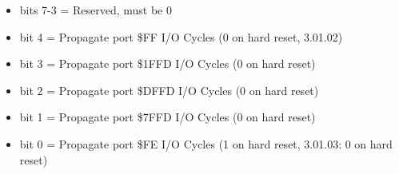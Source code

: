 \begin{itemize}
\item bits 7-3 = Reserved, must be 0
\item bit 4 = Propagate port \$FF I/O Cycles (0 on hard reset, 3.01.02)
\item bit 3 = Propagate port \$1FFD I/O Cycles (0 on hard reset)
\item bit 2 = Propagate port \$DFFD I/O Cycles (0 on hard reset)
\item bit 1 = Propagate port \$7FFD I/O Cycles (0 on hard reset)
\item bit 0 = Propagate port \$FE I/O Cycles (1 on hard reset, 3.01.03:
  0 on hard reset)
\end{itemize}

